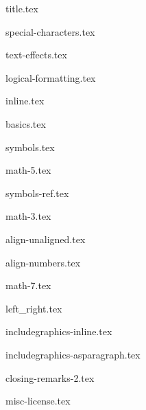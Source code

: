 \documentclass[allauthors,dutch]{../../cursuspresentatie}
\def\importslide#1#2{%
	{#2}
}
\begin{document}
\importslide{beginners_NL}{title.tex}


\importslide{beginners_NL}{special-characters.tex}



\importslide{text}{text-effects.tex}

\importslide{beginners_NL}{logical-formatting.tex}



\importslide{math}{inline.tex}
\importslide{math}{basics.tex}


\importslide{math}{symbols.tex}





\importslide{beginners_NL}{math-5.tex}

\importslide{math}{symbols-ref.tex}

\importslide{beginners_NL}{math-3.tex}




\importslide{math}{align-unaligned.tex}


\importslide{math}{align-numbers.tex}

\importslide{beginners_NL}{math-7.tex}

\importslide{math}{left_right.tex}

\importslide{images}{includegraphics-inline.tex}
\importslide{images}{includegraphics-asparagraph.tex}


\importslide{beginners_NL}{closing-remarks-2.tex}
	
\importslide{misc}{misc-license.tex}
\end{document}

